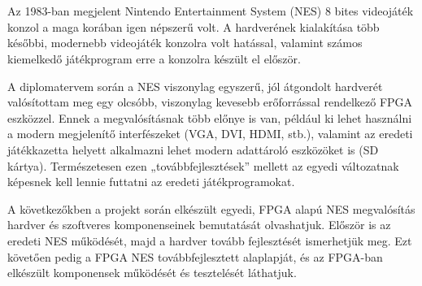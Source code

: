 \chapter{\bevezetes}

Az 1983-ban megjelent Nintendo Entertainment System (NES) 8 bites videojáték konzol a
maga korában igen népszerű volt. A hardverének kialakítása több későbbi, modernebb
videojáték konzolra volt hatással, valamint számos kiemelkedő játékprogram erre a konzolra
készült el először.

A diplomatervem során a NES viszonylag egyszerű, jól átgondolt hardverét valósítottam meg egy olcsóbb, viszonylag kevesebb erőforrással rendelkező FPGA eszközzel. Ennek a megvalósításnak több előnye is van, például ki lehet használni a modern megjelenítő interfészeket (VGA, DVI, HDMI, stb.), valamint az eredeti játékkazetta helyett alkalmazni lehet modern adattároló eszközöket is (SD kártya). Természetesen ezen „továbbfejlesztések” mellett az egyedi változatnak képesnek kell lennie futtatni az eredeti játékprogramokat.

A következőkben a projekt során elkészült egyedi, FPGA alapú NES megvalósítás hardver és szoftveres komponenseinek bemutatását olvashatjuk. Először is az eredeti NES működését, majd a hardver tovább fejlesztését ismerhetjük meg. Ezt követően pedig a FPGA NES továbbfejlesztett alaplapját, és az FPGA-ban elkészült komponensek működését és tesztelését láthatjuk.
